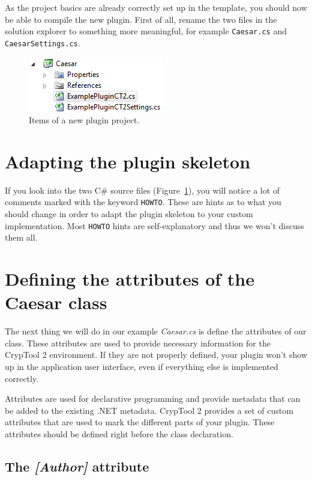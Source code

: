 As the project basics are already correctly set up in the template, you should now be able to compile the new plugin. First of all, rename the two files in the solution explorer to something more meaningful, for example \texttt{Caesar.cs} and \texttt{CaesarSettings.cs}.

\begin{figure}[h!]
	\centering
		\includegraphics{figures/caesar_project.png}
	\caption{Items of a new plugin project.}
	\label{fig:caesar_project}
\end{figure}

\section{Adapting the plugin skeleton}
\label{AdaptingThePluginSkeleton}

If you look into the two C\# source files (Figure~\ref{fig:caesar_project}), you will notice a lot of comments marked with the keyword \texttt{HOWTO}. These are hints as to what you should change in order to adapt the plugin skeleton to your custom implementation. Most \texttt{HOWTO} hints are self-explanatory and thus we won't discuss them all.

\section{Defining the attributes of the Caesar class}
\label{sec:DefiningTheAttributesOfTheCaesarClass}

The next thing we will do in our example \textit{Caesar.cs} is define the attributes of our class. These attributes are used to provide necessary information for the CrypTool 2 environment. If they are not properly defined, your plugin won't show up in the application user interface, even if everything else is implemented correctly.

Attributes are used for declarative programming and provide metadata that can be added to the existing .NET metadata. CrypTool 2 provides a set of custom attributes that are used to mark the different parts of your plugin. These attributes should be defined right before the class declaration.

\subsection{The \protect\textit{[Author]} attribute}
\label{sec:TheAuthorAttribute}

